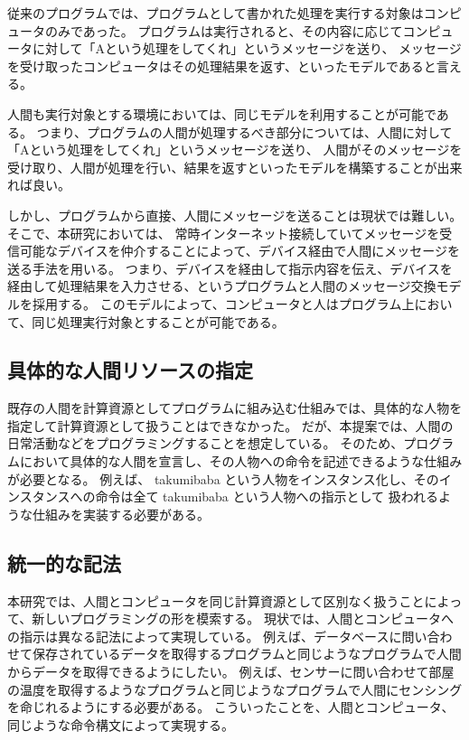 従来のプログラムでは、プログラムとして書かれた処理を実行する対象はコンピュータのみであった。
プログラムは実行されると、その内容に応じてコンピュータに対して「Aという処理をしてくれ」というメッセージを送り、
メッセージを受け取ったコンピュータはその処理結果を返す、といったモデルであると言える。

人間も実行対象とする環境においては、同じモデルを利用することが可能である。
つまり、プログラムの人間が処理するべき部分については、人間に対して「Aという処理をしてくれ」というメッセージを送り、
人間がそのメッセージを受け取り、人間が処理を行い、結果を返すといったモデルを構築することが出来れば良い。

しかし、プログラムから直接、人間にメッセージを送ることは現状では難しい。
そこで、本研究においては、
常時インターネット接続していてメッセージを受信可能なデバイスを仲介することによって、デバイス経由で人間にメッセージを送る手法を用いる。
つまり、デバイスを経由して指示内容を伝え、デバイスを経由して処理結果を入力させる、というプログラムと人間のメッセージ交換モデルを採用する。
このモデルによって、コンピュータと人はプログラム上において、同じ処理実行対象とすることが可能である。

\subsection{具体的な人間リソースの指定}\label{ux5177ux4f53ux7684ux306aux4ebaux9593ux30eaux30bdux30fcux30b9ux306eux6307ux5b9a}

既存の人間を計算資源としてプログラムに組み込む仕組みでは、具体的な人物を指定して計算資源として扱うことはできなかった。
だが、本提案では、人間の日常活動などをプログラミングすることを想定している。
そのため、プログラムにおいて具体的な人間を宣言し、その人物への命令を記述できるような仕組みが必要となる。
例えば、 takumibaba
という人物をインスタンス化し、そのインスタンスへの命令は全て takumibaba
という人物への指示として 扱われるような仕組みを実装する必要がある。

\subsection{統一的な記法}\label{ux7d71ux4e00ux7684ux306aux8a18ux6cd5}

本研究では、人間とコンピュータを同じ計算資源として区別なく扱うことによって、新しいプログラミングの形を模索する。
現状では、人間とコンピュータへの指示は異なる記法によって実現している。
例えば、データベースに問い合わせて保存されているデータを取得するプログラムと同じようなプログラムで人間からデータを取得できるようにしたい。
例えば、センサーに問い合わせて部屋の温度を取得するようなプログラムと同じようなプログラムで人間にセンシングを命じれるようにする必要がある。
こういったことを、人間とコンピュータ、同じような命令構文によって実現する。

